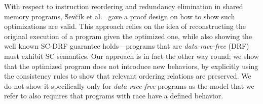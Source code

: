     With respect to instruction reordering and redundancy elimination in shared memory programs, \u{S}ev\u{c}\'{i}k et al.~\cite{Sevcik2} gave a proof design on how to show such optimizations are valid. 
    This approach relies on the idea of reconstructing the original execution of a program given the optimized one, while also showing the well known SC-DRF guarantee holds---programs that are \textit{data-race-free} (DRF) must exhibit SC semantics. 
    Our approach is in fact the other way round; we show that the optimized program does not introduce new behaviors, by explicitly using the consistency rules to show that relevant ordering relations are preserved. 
    We do not show it specifically only for \textit{data-race-free} programs as the model that we refer to also requires that programs with race have a defined behavior. 